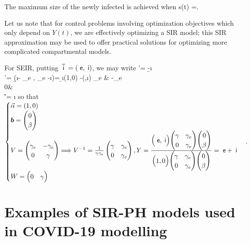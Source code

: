 \im The maximum size of the newly infected is achieved when
     s(t) =. %
    \ee
\EEN
\eeP

\beR Let us note that for control problems involving optimization objectives which only depend on $Y(t)$, we are  effectively optimizing a SIR model;
this SIR approximation may be used to offer practical solutions for optimizing more complicated compartmental models. %
\eeR

\beXa For SEIR, putting $\vec {\;\mathsf i} \;  =(\;\mathsf e , \;\mathsf i)$, we may write
 \bea %
 \bc
 \s'= -\b \s \i \\
 \vi  '=   (\b \s \i  - \g_e \e, \g_e \e  -\g \i)= \b \s \i (1,0)  -(\e,\i) \bep  \g_e & -\g_e \\ 0& \g \eep   \\
 \r'= \g \i
 \ec \eea
so that   $\begin{cases}  \vec \alpha= (1,0) \\  {\mbox{\boldmath$b$}}= \begin{pmatrix}
0 \\\beta
\end{pmatrix}\\V= \begin{pmatrix}  \gamma_e & -\gamma_e \\ 0& \gamma \end{pmatrix} \Longrightarrow V^{-1} = \frac 1{\gamma \gamma_e} \begin{pmatrix}  \gamma & \gamma_e \\ 0& \gamma_e \end{pmatrix},  Y = \frac{\begin{pmatrix} \;\mathsf e,\;\mathsf i \end{pmatrix} \begin{pmatrix}  \gamma & \gamma_e \\ 0& \gamma_e \end{pmatrix} \begin{pmatrix}
0 \\\beta
\end{pmatrix}}{\begin{pmatrix} 1,0 \end{pmatrix} \begin{pmatrix}  \gamma & \gamma_e \\ 0& \gamma_e \end{pmatrix} \begin{pmatrix}
0 \\\beta
\end{pmatrix}}=\;\mathsf e +  \;\mathsf i\\ W= \begin{pmatrix} 0&\gamma\end{pmatrix} \end{cases}.$


\iffalse
We add here a point raised by \cite{Post}: ``
the stage of illness each infected person enters the statistics as
a registered infected one is less reflected in the available data. Hence, the division into latent (exposed) and active forms, i.e any
kind of SEIR-models might be over-complexification with respect to
the actual data uncertainty."
\fi

\eeXa




\section{Examples of SIR-PH models used in COVID-19 modelling }



